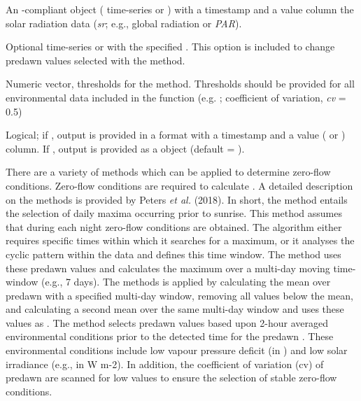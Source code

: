 \documentclass[a4paper]{book}
\begin{document}
\begin{Arguments}
\begin{ldescription}
\item[\code{sr.input}] An -compliant object ( time-series or )
with a timestamp and a value column the solar radiation data (\emph{sr}; e.g., global radiation or \emph{PAR}).

\item[\code{sel.max}] Optional  time-series or  with the specified .
This option is included to change predawn  values selected with the  method.

\item[\code{criteria}] Numeric vector, thresholds for the  method.
Thresholds should be provided for all environmental data included in the function
(e.g. ; coefficient of variation, \emph{cv} = 0.5)

\item[\code{df}] Logical; if , output is provided in a 
format with a timestamp and a value ( or ) column.
If , output is provided as a  object (default = ).
\end{ldescription}
\end{Arguments}
%
\begin{Details}\relax
There are a variety of methods which can be applied to determine zero-flow conditions.
Zero-flow conditions are required to calculate .
A detailed description on the methods is provided by Peters \emph{et al.} (2018).
In short, the  method entails the selection of daily maxima occurring prior to sunrise.
This method assumes that during each night zero-flow conditions are obtained.
The algorithm either requires specific times within which it searches for a maximum,
or it analyses the cyclic pattern within the data and defines this time window.
The  method uses these predawn  values
and calculates the maximum over a multi-day moving time-window (e.g., 7 days).
The  methods is applied by calculating the mean over predawn 
with a specified multi-day window, removing all values below the mean,
and calculating a second mean over the same multi-day window and uses these values as .
The  method selects predawn  values based upon 2-hour averaged environmental
conditions prior to the detected time for the predawn .
These environmental conditions include low vapour pressure deficit (in ) and low solar irradiance
(e.g., in W m-2). In addition, the coefficient of variation (cv) of predawn  are scanned for low values to
ensure the selection of stable zero-flow conditions.
\end{Details}
\end{document}
